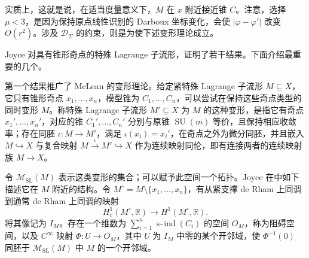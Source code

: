 实质上，这就是说，在适当度量意义下，$M$ 在 $x$ 附近接近锥 $C$。注意，选择 $\mu<3$，是因为保持原点线性识别的 Darboux 坐标变化，会使 $|\varphi-\varphi'|$ 改变 $O(r^2)$。涉及 $\mathcal D_\Sigma$ 的约束，则是为使下述变形理论成立。

Joyce 对具有锥形奇点的特殊 Lagrange 子流形，证明了若干结果。下面介绍最重要的几个。

第一个结果推广了 McLean 的变形理论。给定紧特殊 Lagrange 子流形 $M\subseteq X$，它只有锥形奇点 $x_1,\ldots,x_n$，模型锥为 $C_1,\ldots,C_n$，可以尝试在保持这些奇点类型的同时变形 $M$。称特殊 Lagrange 子流形 $M'\subseteq X$ 为 $M$ 的这种变形，是指它有奇点 $x_1',\ldots,x_n'$，对应的锥 $C_1',\ldots,C_n'$ 分别与原锥 $\operatorname{SU}(m)$ 等价，且保持相应收敛率；存在同胚 $\iota\colon M\to M'$，满足 $\iota(x_i)=x_i'$，在奇点之外为微分同胚，并且嵌入 $M\hookrightarrow X$ 与复合映射 $M\xrightarrow{\iota}M'\hookrightarrow X$ 作为连续映射同伦，即有连接两者的连续映射族 $M\to X$。

令 $\mathcal M_{\mathrm{SL}}(M)$ 表示这类变形的集合；可以赋予此空间一个拓扑。Joyce 在中如下描述它在 $M$ 附近的结构。令 $M^\circ=M\setminus\{x_1,\ldots,x_n\}$，有从紧支撑 de Rham 上同调到通常 de Rham 上同调的映射
\[
H_c^1(M^\circ,\mathbb R)\longrightarrow H^1(M^\circ,\mathbb R).
\]
将其像记为 $I_M$。存在一个维数为 $\sum_{i=1}^n\operatorname{s\!\text{-}\!ind}(C_i)$ 的空间 $O_M$，称为阻碍空间，以及 $C^\infty$ 映射 $\Phi\colon U\to O_M$，其中 $U$ 为 $I_M$ 中零的某个开邻域，使 $\Phi^{-1}(0)$ 同胚于 $\mathcal M_{\mathrm{SL}}(M)$ 中 $M$ 的一个开邻域。

